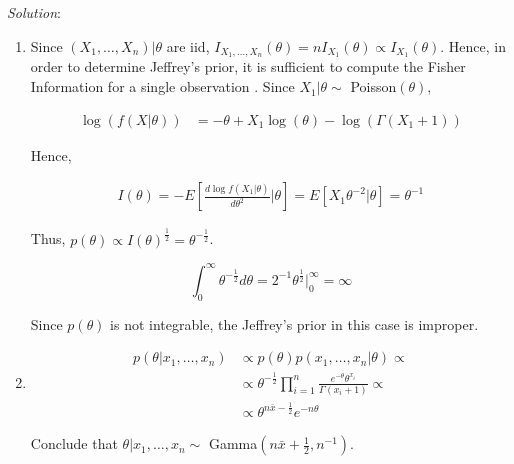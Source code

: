 \documentclass[11pt]{article}
\begin{document}
\begin{enumerate}

\emph{Solution}:

\begin{enumerate}
	\item Since $(X_{1},\ldots,X_{n})|\theta$ are iid, $I_{X_{1},\ldots,X_{n}}(\theta) = nI_{X_{1}}(\theta) \propto I_{X_{1}}(\theta)$. Hence, in order to determine Jeffrey's prior, it is sufficient to compute the Fisher Information for a single observation . Since $X_{1}|\theta \sim$ Poisson$(\theta)$,
	
	\begin{align*}
		\log(f(X|\theta)) 																			&= -\theta + X_{1} \log(\theta) - \log(\Gamma(X_{1}+1))
	\end{align*}	
	
	Hence,
	
	\begin{align*}
		I(\theta) = -E\left[\frac{d \log f(X_{1}|\theta)}{d\theta^{2}} \bigg|\theta \right]	= E[X_{1} \theta^{-2}|\theta] = \theta^{-1}
	\end{align*}
		
	Thus, $p(\theta) \propto I(\theta)^{\frac{1}{2}} = \theta^{-\frac{1}{2}}$.
	
	\[ \int_{0}^{\infty}{\theta^{-\frac{1}{2}}d\theta} = 2^{-1} \theta^{\frac{1}{2}} \big|_{0}^{\infty} = \infty \]
	
	Since $p(\theta)$ is not integrable, the Jeffrey's prior in this case is improper.
	
	\item
	
	\begin{align*}
		p(\theta|x_{1},\ldots,x_{n})	&\propto p(\theta) p(x_{1},\ldots,x_{n}|\theta) \propto \\
																	&\propto \theta^{-\frac{1}{2}} \prod_{i=1}^{n}{\frac{e^{-\theta}\theta^{x_{i}}}{\Gamma(x_{i}+1)}} \propto \\
																	&\propto \theta^{n\bar{x}-\frac{1}{2}} e^{-n\theta}
	\end{align*}
	
	Conclude that $\theta|x_{1},\ldots,x_{n} \sim$ Gamma$\left(n\bar{x}+ \frac{1}{2},n^{-1}\right)$.
	
\end{enumerate}


\end{enumerate}
\end{document}
